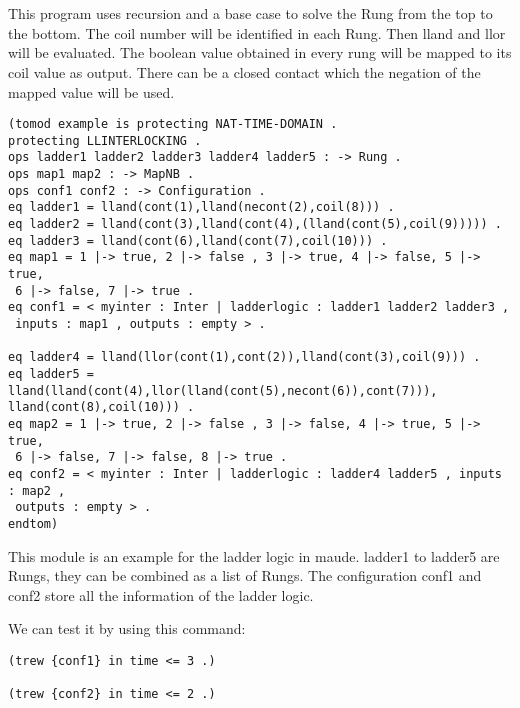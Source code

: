 \documentclass{article}
\begin{document}
\\\\
This program uses recursion and a base case to solve the Rung from the top to the bottom. The coil number will be identified in each Rung. Then lland and llor will be evaluated. The boolean value obtained in every rung will be mapped to its coil value as output. There can be a closed contact which the negation of the mapped value will be used.
\newpage
\begin{verbatim}
(tomod example is protecting NAT-TIME-DOMAIN .
protecting LLINTERLOCKING .
ops ladder1 ladder2 ladder3 ladder4 ladder5 : -> Rung .
ops map1 map2 : -> MapNB .
ops conf1 conf2 : -> Configuration .
eq ladder1 = lland(cont(1),lland(necont(2),coil(8))) .
eq ladder2 = lland(cont(3),lland(cont(4),(lland(cont(5),coil(9))))) .
eq ladder3 = lland(cont(6),lland(cont(7),coil(10))) .
eq map1 = 1 |-> true, 2 |-> false , 3 |-> true, 4 |-> false, 5 |-> true, 
 6 |-> false, 7 |-> true .
eq conf1 = < myinter : Inter | ladderlogic : ladder1 ladder2 ladder3 , 
 inputs : map1 , outputs : empty > .

eq ladder4 = lland(llor(cont(1),cont(2)),lland(cont(3),coil(9))) .
eq ladder5 = lland(lland(cont(4),llor(lland(cont(5),necont(6)),cont(7))),
lland(cont(8),coil(10))) .
eq map2 = 1 |-> true, 2 |-> false , 3 |-> false, 4 |-> true, 5 |-> true, 
 6 |-> false, 7 |-> false, 8 |-> true .
eq conf2 = < myinter : Inter | ladderlogic : ladder4 ladder5 , inputs : map2 , 
 outputs : empty > .
endtom)
\end{verbatim}

This module is an example for the ladder logic in maude. ladder1 to ladder5 are Rungs, they can be combined as a list of Rungs. The configuration conf1 and conf2 store all the information of the ladder logic. 

We can test it by using this command:
\begin{verbatim} 
(trew {conf1} in time <= 3 .)

(trew {conf2} in time <= 2 .)
\end{verbatim}
\end{document}
